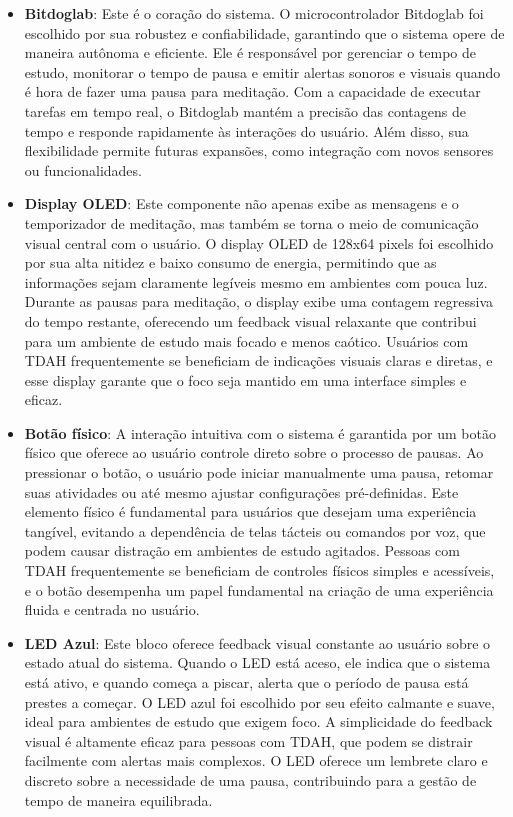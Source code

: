 \documentclass{article}
\begin{document}
\begin{itemize} \item \textbf{Bitdoglab}: Este é o coração do sistema. O microcontrolador Bitdoglab foi escolhido por sua robustez e confiabilidade, garantindo que o sistema opere de maneira autônoma e eficiente. Ele é responsável por gerenciar o tempo de estudo, monitorar o tempo de pausa e emitir alertas sonoros e visuais quando é hora de fazer uma pausa para meditação. Com a capacidade de executar tarefas em tempo real, o Bitdoglab mantém a precisão das contagens de tempo e responde rapidamente às interações do usuário. Além disso, sua flexibilidade permite futuras expansões, como integração com novos sensores ou funcionalidades.
  \item \textbf{Display OLED}: Este componente não apenas exibe as mensagens e o temporizador de meditação, mas também se torna o meio de comunicação visual central com o usuário. O display OLED de 128x64 pixels foi escolhido por sua alta nitidez e baixo consumo de energia, permitindo que as informações sejam claramente legíveis mesmo em ambientes com pouca luz. Durante as pausas para meditação, o display exibe uma contagem regressiva do tempo restante, oferecendo um feedback visual relaxante que contribui para um ambiente de estudo mais focado e menos caótico. Usuários com TDAH frequentemente se beneficiam de indicações visuais claras e diretas, e esse display garante que o foco seja mantido em uma interface simples e eficaz.

  \item \textbf{Botão físico}: A interação intuitiva com o sistema é garantida por um botão físico que oferece ao usuário controle direto sobre o processo de pausas. Ao pressionar o botão, o usuário pode iniciar manualmente uma pausa, retomar suas atividades ou até mesmo ajustar configurações pré-definidas. Este elemento físico é fundamental para usuários que desejam uma experiência tangível, evitando a dependência de telas tácteis ou comandos por voz, que podem causar distração em ambientes de estudo agitados. Pessoas com TDAH frequentemente se beneficiam de controles físicos simples e acessíveis, e o botão desempenha um papel fundamental na criação de uma experiência fluida e centrada no usuário.
  
  \item \textbf{LED Azul}: Este bloco oferece feedback visual constante ao usuário sobre o estado atual do sistema. Quando o LED está aceso, ele indica que o sistema está ativo, e quando começa a piscar, alerta que o período de pausa está prestes a começar. O LED azul foi escolhido por seu efeito calmante e suave, ideal para ambientes de estudo que exigem foco. A simplicidade do feedback visual é altamente eficaz para pessoas com TDAH, que podem se distrair facilmente com alertas mais complexos. O LED oferece um lembrete claro e discreto sobre a necessidade de uma pausa, contribuindo para a gestão de tempo de maneira equilibrada.
\end{itemize}
\end{document}
